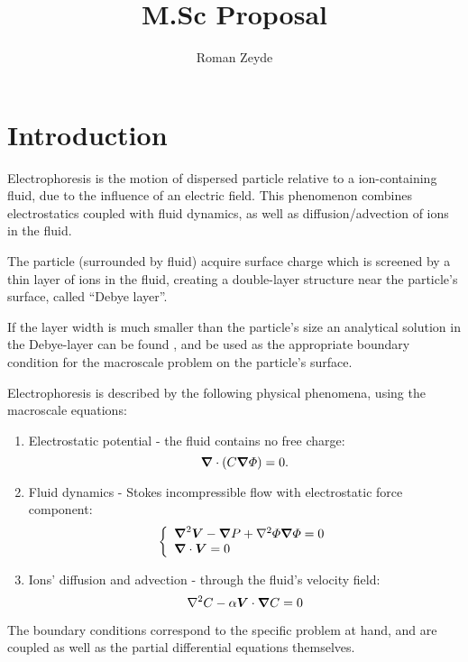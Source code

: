 \documentclass[11pt]{article}
\title{M.Sc Proposal}
\author{Roman Zeyde}
\begin{document}
\maketitle
\section{Introduction}
Electrophoresis is the motion of dispersed particle relative to a ion-containing fluid,
due to the influence of an electric field. This phenomenon combines electrostatics
coupled with fluid dynamics, as well as diffusion/advection of ions in the fluid.

The particle (surrounded by fluid) acquire surface charge which is screened by
a thin layer of ions in the fluid, creating a double-layer structure near the
particle's surface, called ``Debye layer''.

If the layer width is much smaller than the particle's size
an analytical solution in the Debye-layer can be found \cite{Yariv10},
and be used as the appropriate boundary condition for the
macroscale problem on the particle's surface.

Electrophoresis is described by the following physical phenomena,
using the macroscale equations:
\begin{enumerate}
\item Electrostatic potential - the fluid contains no free charge:
\begin{equation}
    \boldsymbol{\nabla} \cdot (C \boldsymbol{\nabla} \varPhi) = 0.
\end{equation}
\item Fluid dynamics - Stokes incompressible flow with electrostatic force component:
\begin{equation}
\left\{ \begin{array}{l}
\boldsymbol{\nabla}^2 \boldsymbol{V} - \boldsymbol{\nabla} P + \nabla^2 \varPhi \boldsymbol{\nabla} \varPhi = 0 \\
\boldsymbol{\nabla} \cdot \boldsymbol{V} = 0 \end{array} \right.
\end{equation}
\item Ions' diffusion and advection - through the fluid's velocity field:
\begin{equation}
\nabla^2 C - \alpha \boldsymbol{V} \cdot \boldsymbol{\nabla} C = 0
\end{equation}
\end{enumerate}

The boundary conditions correspond to the specific problem at hand, and
are coupled as well as the partial differential equations themselves.
\end{document}
